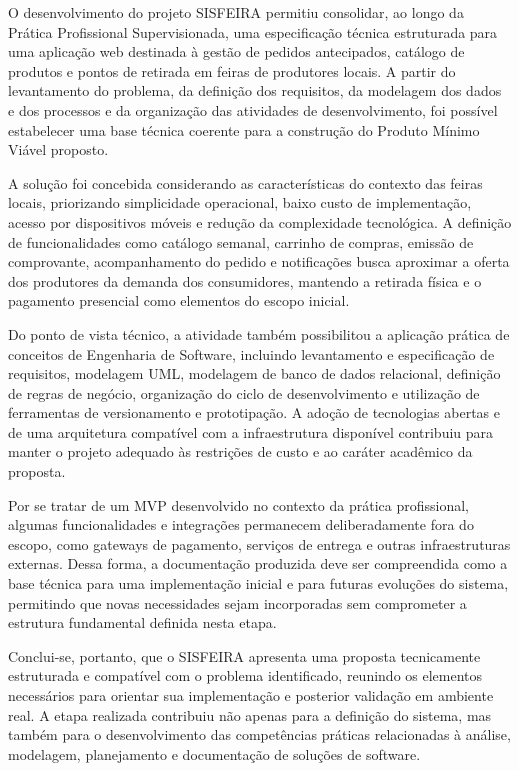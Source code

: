 \documentclass[12pt,a4paper]{article}
\begin{document}
O desenvolvimento do projeto SISFEIRA permitiu consolidar, ao longo da Prática Profissional Supervisionada, uma especificação técnica estruturada para uma aplicação web destinada à gestão de pedidos antecipados, catálogo de produtos e pontos de retirada em feiras de produtores locais. A partir do levantamento do problema, da definição dos requisitos, da modelagem dos dados e dos processos e da organização das atividades de desenvolvimento, foi possível estabelecer uma base técnica coerente para a construção do Produto Mínimo Viável proposto.

A solução foi concebida considerando as características do contexto das feiras locais, priorizando simplicidade operacional, baixo custo de implementação, acesso por dispositivos móveis e redução da complexidade tecnológica. A definição de funcionalidades como catálogo semanal, carrinho de compras, emissão de comprovante, acompanhamento do pedido e notificações busca aproximar a oferta dos produtores da demanda dos consumidores, mantendo a retirada física e o pagamento presencial como elementos do escopo inicial.

Do ponto de vista técnico, a atividade também possibilitou a aplicação prática de conceitos de Engenharia de Software, incluindo levantamento e especificação de requisitos, modelagem UML, modelagem de banco de dados relacional, definição de regras de negócio, organização do ciclo de desenvolvimento e utilização de ferramentas de versionamento e prototipação. A adoção de tecnologias abertas e de uma arquitetura compatível com a infraestrutura disponível contribuiu para manter o projeto adequado às restrições de custo e ao caráter acadêmico da proposta.

Por se tratar de um MVP desenvolvido no contexto da prática profissional, algumas funcionalidades e integrações permanecem deliberadamente fora do escopo, como gateways de pagamento, serviços de entrega e outras infraestruturas externas. Dessa forma, a documentação produzida deve ser compreendida como a base técnica para uma implementação inicial e para futuras evoluções do sistema, permitindo que novas necessidades sejam incorporadas sem comprometer a estrutura fundamental definida nesta etapa.

Conclui-se, portanto, que o SISFEIRA apresenta uma proposta tecnicamente estruturada e compatível com o problema identificado, reunindo os elementos necessários para orientar sua implementação e posterior validação em ambiente real. A etapa realizada contribuiu não apenas para a definição do sistema, mas também para o desenvolvimento das competências práticas relacionadas à análise, modelagem, planejamento e documentação de soluções de software.
\end{document}
